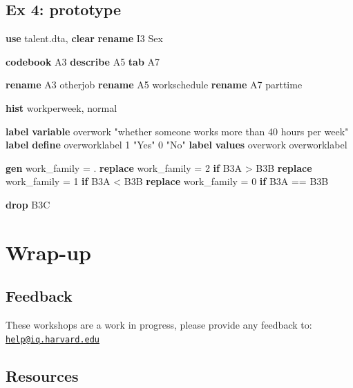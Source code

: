 \documentclass[
]{book}
\newenvironment{Shaded}{\begin{snugshade}}{\end{snugshade}}
\newcommand{\FunctionTok}[1]{\textcolor[rgb]{0.00,0.00,0.00}{#1}}
\newcommand{\KeywordTok}[1]{\textcolor[rgb]{0.13,0.29,0.53}{\textbf{#1}}}
\newcommand{\NormalTok}[1]{#1}
\newcommand{\StringTok}[1]{\textcolor[rgb]{0.31,0.60,0.02}{#1}}
\begin{document}
\hypertarget{ex-4-prototype-2}{%
\subsection{Ex 4: prototype}\label{ex-4-prototype-2}}

\begin{Shaded}
\begin{Highlighting}[]
\KeywordTok{use}\NormalTok{ talent.dta, }\KeywordTok{clear}
\KeywordTok{rename}\NormalTok{ I3 Sex}

\KeywordTok{codebook}\NormalTok{ A3}
\KeywordTok{describe}\NormalTok{ A5}
\KeywordTok{tab}\NormalTok{ A7}

\KeywordTok{rename}\NormalTok{ A3 otherjob}
\KeywordTok{rename}\NormalTok{ A5 workschedule}
\KeywordTok{rename}\NormalTok{ A7 parttime}

\KeywordTok{hist}\NormalTok{ workperweek, }\FunctionTok{normal}

\KeywordTok{label} \KeywordTok{variable}\NormalTok{ overwork }\StringTok{"whether someone works more than 40 hours per week"}
\KeywordTok{label} \KeywordTok{define}\NormalTok{ overworklabel 1 }\StringTok{"Yes"}\NormalTok{ 0 }\StringTok{"No"}
\KeywordTok{label} \KeywordTok{values}\NormalTok{ overwork overworklabel}

\KeywordTok{gen}\NormalTok{ work_family = .}
\KeywordTok{replace}\NormalTok{ work_family = 2 }\KeywordTok{if}\NormalTok{ B3A > B3B}
\KeywordTok{replace}\NormalTok{ work_family = 1 }\KeywordTok{if}\NormalTok{ B3A < B3B}
\KeywordTok{replace}\NormalTok{ work_family = 0 }\KeywordTok{if}\NormalTok{ B3A == B3B}

\KeywordTok{drop}\NormalTok{ B3C}
\end{Highlighting}
\end{Shaded}

\hypertarget{wrap-up-7}{%
\section{Wrap-up}\label{wrap-up-7}}

\hypertarget{feedback-7}{%
\subsection{Feedback}\label{feedback-7}}

These workshops are a work in progress, please provide any feedback to: \href{mailto:help@iq.harvard.edu}{\nolinkurl{help@iq.harvard.edu}}

\hypertarget{resources-9}{%
\subsection{Resources}\label{resources-9}}
\end{document}
